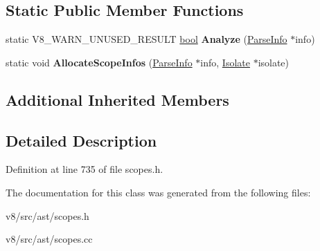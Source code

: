\subsection*{Static Public Member Functions}
\begin{DoxyCompactItemize}
\item 
\mbox{\label{classv8_1_1internal_1_1DeclarationScope_a090845694a80550e3fc356b8568989b3}} 
static V8\+\_\+\+W\+A\+R\+N\+\_\+\+U\+N\+U\+S\+E\+D\+\_\+\+R\+E\+S\+U\+LT \mbox{\hyperlink{classbool}{bool}} {\bfseries Analyze} (\mbox{\hyperlink{classv8_1_1internal_1_1ParseInfo}{Parse\+Info}} $\ast$info)
\item 
\mbox{\label{classv8_1_1internal_1_1DeclarationScope_a5d57217b380c06e14e1fd591e4dd23ea}} 
static void {\bfseries Allocate\+Scope\+Infos} (\mbox{\hyperlink{classv8_1_1internal_1_1ParseInfo}{Parse\+Info}} $\ast$info, \mbox{\hyperlink{classv8_1_1internal_1_1Isolate}{Isolate}} $\ast$isolate)
\end{DoxyCompactItemize}
\subsection*{Additional Inherited Members}


\subsection{Detailed Description}


Definition at line 735 of file scopes.\+h.



The documentation for this class was generated from the following files\+:\begin{DoxyCompactItemize}
\item 
v8/src/ast/scopes.\+h\item 
v8/src/ast/scopes.\+cc\end{DoxyCompactItemize}
